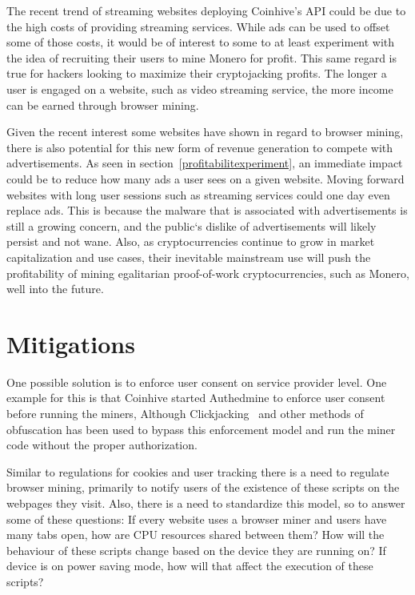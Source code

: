 The recent trend of streaming websites deploying Coinhive's API could be due to the high costs of providing streaming services. While ads can be used to offset some of those costs, it would be of interest to some to at least experiment with the idea of recruiting their users to mine Monero for profit. This same regard is true for hackers looking to maximize their cryptojacking profits. The longer a user is engaged on a website, such as video streaming service, the more income can be earned through browser mining.

Given the recent interest some websites have shown in regard to browser mining, there is also potential for this new form of revenue generation to compete with advertisements. As seen in section~\ref{profitabilitexperiment}, an immediate impact could be to reduce how many ads a user sees on a given website. Moving forward websites with long user sessions such as streaming services could one day even replace ads. This is because the malware that is associated with advertisements is still a growing concern, and the public`s dislike of advertisements will likely persist and not wane. Also, as cryptocurrencies continue to grow in market capitalization and use cases, their inevitable mainstream use will push the profitability of mining egalitarian proof-of-work cryptocurrencies, such as Monero, well into the future. 




\section{Mitigations}

One possible solution is to enforce user consent on service provider level. One example for this is that Coinhive started Authedmine to enforce user consent before running the miners, Although Clickjacking~\cite{rydstedt2010busting} and other methods of obfuscation has been used to bypass this enforcement model and run the miner code without the proper authorization.

Similar to regulations for cookies and user tracking there is a need to regulate browser mining, primarily to notify users of the existence of these scripts on the webpages they visit. Also, there is a need to standardize this model, so to answer some of these questions: If every website uses a browser miner and users have many tabs open, how are CPU resources shared between them? How will the behaviour of these scripts change based on the device they are running on? If device is on power saving mode, how will that affect the execution of these scripts?

